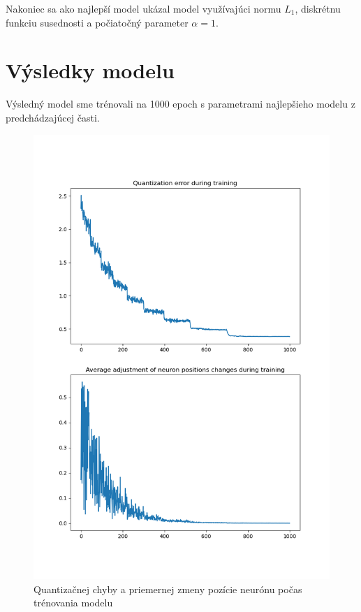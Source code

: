 \documentclass[a4paper]{article}
\begin{document}
	Nakoniec sa ako najlepší model ukázal model využívajúci normu $L_1$, diskrétnu funkciu susednosti a počiatočný parameter $\alpha=1$.
	
	\section{Výsledky modelu}
	
	Výsledný model sme trénovali na 1000 epoch s parametrami najlepšieho modelu z predchádzajúcej časti.

	\begin{figure}[!h]
		\centering
		\includegraphics[width=\textwidth]{../errors.png}
		\caption{Quantizačnej chyby a priemernej zmeny pozície neurónu počas trénovania modelu }
	\end{figure}
	
\end{document}
